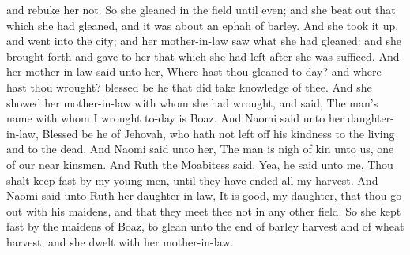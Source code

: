 and rebuke her not.  So she gleaned in the field until even; and she beat out that which she had gleaned, and it was about an ephah of barley. And she took it up, and went into the city; and her mother-in-law saw what she had gleaned: and she brought forth and gave to her that which she had left after she was sufficed. And her mother-in-law said unto her, Where hast thou gleaned to-day? and where hast thou wrought? blessed be he that did take knowledge of thee. And she showed her mother-in-law with whom she had wrought, and said, The man’s name with whom I wrought to-day is Boaz. And Naomi said unto her daughter-in-law, Blessed be he of Jehovah, who hath not left off his kindness to the living and to the dead. And Naomi said unto her, The man is nigh of kin unto us, one of our near kinsmen. And Ruth the Moabitess said, Yea, he said unto me, Thou shalt keep fast by my young men, until they have ended all my harvest. And Naomi said unto Ruth her daughter-in-law, It is good, my daughter, that thou go out with his maidens, and that they meet thee not in any other field. So she kept fast by the maidens of Boaz, to glean unto the end of barley harvest and of wheat harvest; and she dwelt with her mother-in-law. 

